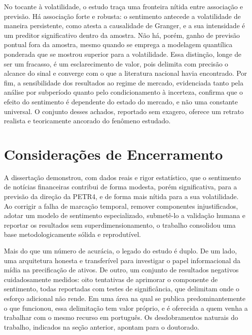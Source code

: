 No tocante à volatilidade, o estudo traça uma fronteira nítida entre associação e previsão. Há associação forte e robusta: o sentimento antecede a volatilidade de maneira persistente, como atesta a causalidade de Granger, e a sua intensidade é um preditor significativo dentro da amostra. Não há, porém, ganho de previsão pontual fora da amostra, mesmo quando se emprega a modelagem quantílica ponderada que se mostrou superior para a volatilidade. Essa distinção, longe de ser um fracasso, é um esclarecimento de valor, pois delimita com precisão o alcance do sinal e converge com o que a literatura nacional havia encontrado. Por fim, a sensibilidade dos resultados ao regime de mercado, evidenciada tanto pela análise por subperíodo quanto pelo condicionamento à incerteza, confirma que o efeito do sentimento é dependente do estado do mercado, e não uma constante universal. O conjunto desses achados, reportado sem exagero, oferece um retrato realista e teoricamente ancorado do fenômeno estudado.

\section{Considerações de Encerramento}

A dissertação demonstrou, com dados reais e rigor estatístico, que o sentimento de notícias financeiras contribui de forma modesta, porém significativa, para a previsão da direção da PETR4, e de forma mais nítida para a sua volatilidade. Ao corrigir a falha de marcação temporal, remover componentes injustificados, adotar um modelo de sentimento especializado, submetê-lo a validação humana e reportar os resultados sem superdimensionamento, o trabalho consolidou uma base metodologicamente sólida e reprodutível.

Mais do que um número de acurácia, o legado do estudo é duplo. De um lado, uma arquitetura honesta e transferível para investigar o papel informacional da mídia na precificação de ativos. De outro, um conjunto de resultados negativos cuidadosamente medidos: oito tentativas de aprimorar o componente de sentimento, todas reportadas com testes de significância, que delimitam onde o esforço adicional não rende. Em uma área na qual se publica predominantemente o que funcionou, essa delimitação tem valor próprio, e é oferecida a quem venha a trabalhar com o mesmo recurso em português. Os desdobramentos naturais do trabalho, indicados na seção anterior, apontam para o doutorado.
